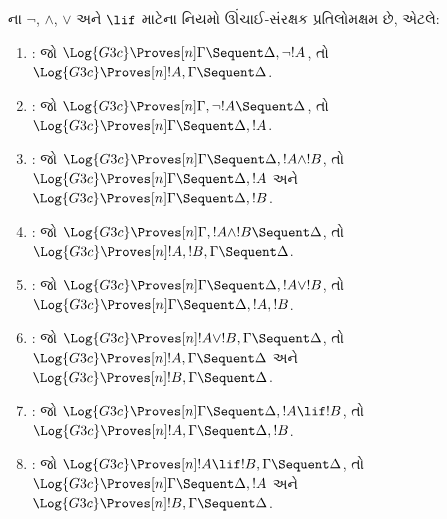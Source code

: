 \begin{lem}
ના $\lnot$, $\land$, $\lor$ અને $\lif$ માટેના નિયમો
ઊંચાઈ-સંરક્ષક પ્રતિલોમક્ષમ છે, એટલે:
\begin{enumerate}
  \item \RightR{\lnot}: જો $\Log{G3c} \Proves[n] \Gamma \Sequent
  \Delta, \lnot !A$, તો $\Log{G3c} \Proves[n] !A, \Gamma \Sequent
  \Delta$.
  \item \LeftR{\lnot}: જો $\Log{G3c} \Proves[n] \Gamma, \lnot !A
  \Sequent \Delta$, તો $\Log{G3c} \Proves[n] \Gamma \Sequent \Delta,
  !A$.
  \item \RightR{\land}: જો $\Log{G3c} \Proves[n] \Gamma \Sequent
  \Delta, !A \land !B$, તો $\Log{G3c} \Proves[n] \Gamma \Sequent
  \Delta, !A$ અને $\Log{G3c} \Proves[n] \Gamma \Sequent
  \Delta, !B$.
  \item \LeftR{\land}: જો $\Log{G3c} \Proves[n] \Gamma, !A \land !B
  \Sequent \Delta$, તો $\Log{G3c} \Proves[n] !A, !B, \Gamma \Sequent
  \Delta$.
  \item \RightR{\lor}: જો $\Log{G3c} \Proves[n] \Gamma \Sequent
  \Delta, !A \lor !B$, તો $\Log{G3c} \Proves[n] \Gamma \Sequent
  \Delta, !A, !B$.
  \item \LeftR{\lor}: જો $\Log{G3c} \Proves[n] !A \lor !B, \Gamma \Sequent
  \Delta$, તો $\Log{G3c} \Proves[n] !A, \Gamma \Sequent
  \Delta$ અને $\Log{G3c} \Proves[n] !B, \Gamma \Sequent
  \Delta$.
  \item \RightR{\lif}: જો $\Log{G3c} \Proves[n] \Gamma \Sequent
  \Delta, !A \lif !B$, તો $\Log{G3c} \Proves[n] !A, \Gamma \Sequent
  \Delta, !B$.
  \item \LeftR{\lif}: જો $\Log{G3c} \Proves[n] !A \lif !B, \Gamma
  \Sequent \Delta$, તો $\Log{G3c} \Proves[n] \Gamma \Sequent \Delta,
  !A$ અને $\Log{G3c} \Proves[n] !B, \Gamma \Sequent \Delta$.
\end{enumerate}
\end{lem}

